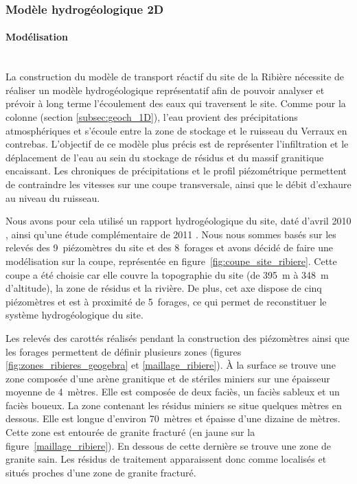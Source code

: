\documentclass{article}
\begin{document}
\subsubsection{Modèle hydrogéologique 2D}
\paragraph{Modélisation \\ \\}
La construction du modèle de transport réactif du site de la Ribière nécessite de réaliser un modèle hydrogéologique représentatif afin de pouvoir analyser et prévoir à long terme l'écoulement des eaux qui traversent le site. 
Comme pour la colonne (section \ref{subsec:geoch_1D}), l'eau provient des précipitations atmosphériques et s'écoule entre la zone de stockage et le ruisseau du Verraux en contrebas. L'objectif de ce modèle plus précis est de représenter l'infiltration et le déplacement de l'eau au sein du stockage de résidus et du massif granitique encaissant. Les chroniques de précipitations et le profil piézométrique permettent de contraindre les vitesses sur une coupe transversale, ainsi que le débit d'exhaure au niveau du ruisseau.

Nous avons pour cela utilisé un rapport hydrogéologique du site, daté d'avril 2010 \cite{societe_areva_nc_etude_2010}, ainsi qu'une étude complémentaire de 2011 \cite{societe_areva_nc_etude_2011}. Nous nous sommes basés sur les relevés des 9~piézomètres du site et des 8~forages et avons décidé de faire une modélisation sur la coupe,  représentée en figure~\ref{fig:coupe_site_ribiere}.
Cette coupe a été choisie car elle couvre la topographie du site (de 395~m à 348~m d'altitude), la zone de résidus et la rivière. De plus, cet axe dispose de cinq piézomètres et est à proximité de 5~forages, ce qui permet de reconstituer le système hydrogéologique du site.

Les relevés des carottés réalisés pendant la construction des piézomètres ainsi que les forages permettent de définir plusieurs zones (figures \ref{fig:zones_ribieres_geogebra} et \ref{maillage_ribiere}). À la surface se trouve une zone composée d’une arène granitique et de stériles miniers sur une épaisseur moyenne de 4~mètres. Elle est composée de deux faciès, un faciès sableux et un faciès boueux. La zone contenant les résidus miniers se situe quelques mètres en dessous. Elle est longue d'environ 70~mètres et épaisse d'une dizaine de mètres. Cette zone est entourée de granite fracturé (en jaune sur la figure~\ref{maillage_ribiere}). En dessous de cette dernière se trouve une zone de granite sain. Les résidus de traitement apparaissent donc comme localisés et situés proches d’une zone de granite fracturé. 
\end{document}
